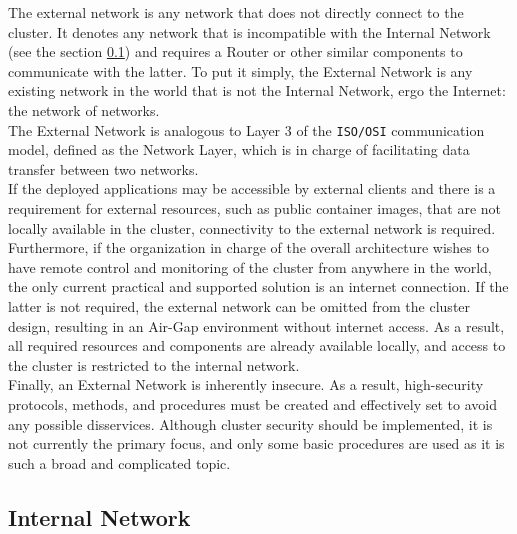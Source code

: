 The external network is any network that does not directly connect to the
cluster. It denotes any network that is incompatible with the Internal Network (see
the section \ref{subsec:architecture_network_internal_network}) and requires a Router
or other similar components to communicate with the latter. To put it simply, the
External Network is any existing network in the world that is not the Internal Network,
ergo the Internet: the network of networks. \\ %
The External Network is analogous to Layer 3 of the \texttt{ISO/OSI}
communication model, defined as the Network Layer, which is in charge of
facilitating data transfer between two networks. \\ %
If the deployed applications may be accessible by external clients and there is
a requirement for external resources, such as public container images, that are
not locally available in the cluster, connectivity to the external network is required.
Furthermore, if the organization in charge of the overall architecture wishes to
have remote control and monitoring of the cluster from anywhere in the world,
the only current practical and supported solution is an internet connection. If the
latter is not required, the external network can be omitted from the cluster
design, resulting in an Air-Gap environment without internet access. As a result,
all required resources and components are already available locally, and access
to the cluster is restricted to the internal network. \\ %
Finally, an External Network is inherently insecure. As a result, high-security protocols,
methods, and procedures must be created and effectively set to avoid any possible
disservices. Although cluster security should be implemented, it is not currently
the primary focus, and only some basic procedures are used as it is such a broad
and complicated topic.

\subsection{Internal Network}
\label{subsec:architecture_network_internal_network}

